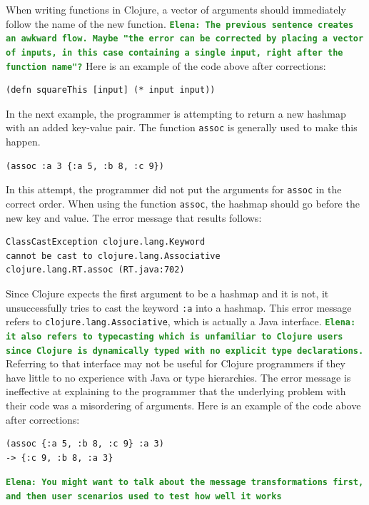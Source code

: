 \documentclass[12pt]{article}
\newcommand{\comment}[1]{{\bf \tt  {#1}}}
\newcommand{\emcomment}[1]{\textcolor{ForestGreen}{\comment{Elena: {#1}}}}
\begin{document}
When writing functions in Clojure, a vector of arguments should immediately follow the name of the new function. 
\emcomment{The previous sentence creates an awkward flow. Maybe "the error can be corrected by placing a vector of inputs, in this case containing a single input, right after the function name"?}
Here is an example of the code above after corrections:
\begin{verbatim}
(defn squareThis [input] (* input input))
\end{verbatim}

In the next example, the programmer is attempting to return a new hashmap with an added key-value pair.
The function \texttt{assoc} is generally used to make this happen.
\begin{verbatim}
(assoc :a 3 {:a 5, :b 8, :c 9})
\end{verbatim}

In this attempt, the programmer did not put the arguments for \texttt{assoc} in the correct order.
When using the function \texttt{assoc}, the hashmap should go before the new key and value.
The error message that results follows:

\begin{verbatim}
ClassCastException clojure.lang.Keyword 
cannot be cast to clojure.lang.Associative
clojure.lang.RT.assoc (RT.java:702)
\end{verbatim}

Since Clojure expects the first argument to be a hashmap and it is not, it unsuccessfully tries to cast the keyword \texttt{:a} into a hashmap.
This error message refers to \texttt{clojure.lang.Associative}, which is actually a Java interface.
\emcomment{it also refers to typecasting which is unfamiliar to Clojure users since Clojure is dynamically typed with no explicit type declarations.}
Referring to that interface may not be useful for Clojure programmers if they have little to no experience with Java or type hierarchies.
The error message is ineffective at explaining to the programmer that the underlying problem with their code was a misordering of arguments. Here is an example of the code above after corrections:
 
\begin{verbatim}
(assoc {:a 5, :b 8, :c 9} :a 3)
-> {:c 9, :b 8, :a 3}
\end{verbatim}

\emcomment{You might want to talk about the message transformations first, and then user scenarios used to test how well it works} 
\end{document}
